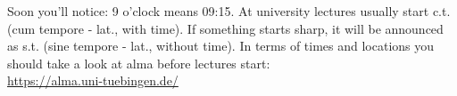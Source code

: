 
Soon you'll notice: 9 o'clock means 09:15. At university lectures usually start c.t. (cum
tempore - lat., with time). If something starts \glqq sharp\grqq, it will be announced as s.t. (sine tempore - lat., without
time). In terms of times and locations you should take a look at alma before lectures start:\\
\url{https://alma.uni-tuebingen.de/}
